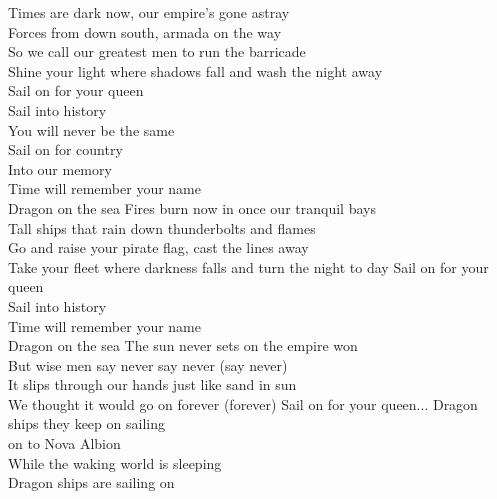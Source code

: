 Times are dark now, our empire's gone astray\tab{}\\
Forces from down south, armada on the way\tab{}\\
So we call our greatest men to run the barricade\\
Shine your light where shadows fall and wash the night away\\
\hops
{} Sail on for your queen\tab{}\\
 Sail into history\tab{}\\
 You will never be the same\\
 Sail on for country\tab{}\\
 Into our memory\tab{}\\
 Time will remember your name\\
 Dragon on the sea\tab{}
\hops
Fires burn now in once our tranquil bays\\
Tall ships that rain down thunderbolts and flames\\
Go and raise your pirate flag, cast the lines away\\
Take your fleet where darkness falls and turn the night to day
\hops
{} Sail on for your queen\\
 Sail into history\\
 Time will remember your name\\
 Dragon on the sea
\hops
The sun never sets on the empire won\tab{}\\
But wise men say never say never (say never)\tab{}\\
It slips through our hands just like sand in sun\\
We thought it would go on forever (forever)\tab{}
\hops
{} Sail on for your queen...
\hops
Dragon ships they keep on sailing\tab{}\\
on to Nova Albion\tab{}\tab{}\\
While the waking world is sleeping\tab{}\\
Dragon ships are sailing on\tab{}\tab{}